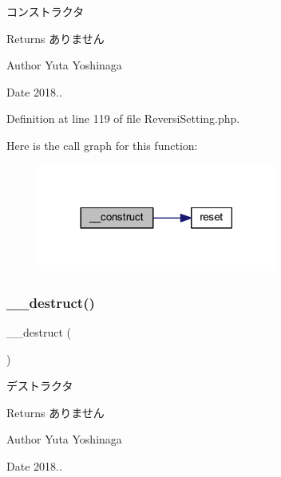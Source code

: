 コンストラクタ 

\begin{DoxyReturn}{Returns}
ありません 
\end{DoxyReturn}
\begin{DoxyAuthor}{Author}
Yuta Yoshinaga 
\end{DoxyAuthor}
\begin{DoxyDate}{Date}
2018.. 
\end{DoxyDate}


Definition at line 119 of file Reversi\+Setting.\+php.

Here is the call graph for this function\+:\nopagebreak
\begin{figure}[H]
\begin{center}
\leavevmode
\includegraphics[width=222pt]{class_reversi_setting_a095c5d389db211932136b53f25f39685_cgraph}
\end{center}
\end{figure}
\mbox{\label{class_reversi_setting_a421831a265621325e1fdd19aace0c758}} 
\subsubsection{\texorpdfstring{\+\_\+\+\_\+destruct()}{\_\_destruct()}}
{\footnotesize\ttfamily \+\_\+\+\_\+destruct (\begin{DoxyParamCaption}{ }\end{DoxyParamCaption})}



デストラクタ 

\begin{DoxyReturn}{Returns}
ありません 
\end{DoxyReturn}
\begin{DoxyAuthor}{Author}
Yuta Yoshinaga 
\end{DoxyAuthor}
\begin{DoxyDate}{Date}
2018.. 
\end{DoxyDate}


